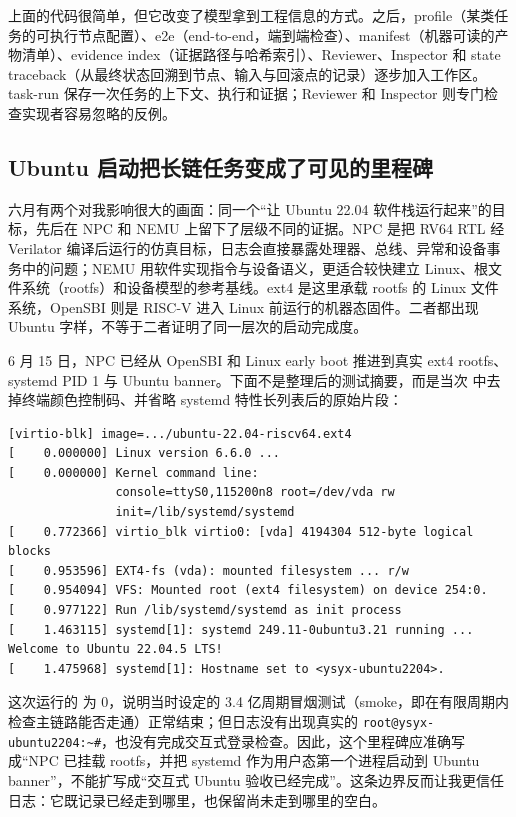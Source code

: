 \documentclass[UTF8,a4paper,zihao=-4,oneside]{ctexart}
\newcommand{\taskpath}[1]{\path{#1}}
\begin{document}
上面的代码很简单，但它改变了模型拿到工程信息的方式。之后，profile（某类任务的可执行节点配置）、e2e（end-to-end，端到端检查）、manifest（机器可读的产物清单）、evidence index（证据路径与哈希索引）、Reviewer、Inspector 和 state traceback（从最终状态回溯到节点、输入与回滚点的记录）逐步加入工作区。task-run 保存一次任务的上下文、执行和证据；Reviewer 和 Inspector 则专门检查实现者容易忽略的反例。

\subsection{Ubuntu 启动把长链任务变成了可见的里程碑}

六月有两个对我影响很大的画面：同一个“让 Ubuntu 22.04 软件栈运行起来”的目标，先后在 NPC 和 NEMU 上留下了层级不同的证据。NPC 是把 RV64 RTL 经 Verilator 编译后运行的仿真目标，日志会直接暴露处理器、总线、异常和设备事务中的问题；NEMU 用软件实现指令与设备语义，更适合较快建立 Linux、根文件系统（rootfs）和设备模型的参考基线。ext4 是这里承载 rootfs 的 Linux 文件系统，OpenSBI 则是 RISC-V 进入 Linux 前运行的机器态固件。二者都出现 Ubuntu 字样，不等于二者证明了同一层次的启动完成度。

6 月 15 日，NPC 已经从 OpenSBI 和 Linux early boot 推进到真实 ext4 rootfs、systemd PID 1 与 Ubuntu banner。下面不是整理后的测试摘要，而是当次 \taskpath{console.log} 中去掉终端颜色控制码、并省略 systemd 特性长列表后的原始片段：

\noindent\begin{minipage}{\linewidth}
\begin{lstlisting}[numbers=none,
  caption={NPC/Verilator 启动 Ubuntu 22.04 rootfs 的日志摘录（2026-06-15）},
  label={log:npc-ubuntu}]
[virtio-blk] image=.../ubuntu-22.04-riscv64.ext4
[    0.000000] Linux version 6.6.0 ...
[    0.000000] Kernel command line:
               console=ttyS0,115200n8 root=/dev/vda rw
               init=/lib/systemd/systemd
[    0.772366] virtio_blk virtio0: [vda] 4194304 512-byte logical blocks
[    0.953596] EXT4-fs (vda): mounted filesystem ... r/w
[    0.954094] VFS: Mounted root (ext4 filesystem) on device 254:0.
[    0.977122] Run /lib/systemd/systemd as init process
[    1.463115] systemd[1]: systemd 249.11-0ubuntu3.21 running ...
Welcome to Ubuntu 22.04.5 LTS!
[    1.475968] systemd[1]: Hostname set to <ysyx-ubuntu2204>.
\end{lstlisting}
\end{minipage}

这次运行的 \taskpath{run.rc} 为 0，说明当时设定的 3.4 亿周期冒烟测试（smoke，即在有限周期内检查主链路能否走通）正常结束；但日志没有出现真实的 \texttt{root@ysyx-ubuntu2204:\textasciitilde\#}，也没有完成交互式登录检查。因此，这个里程碑应准确写成“NPC 已挂载 rootfs，并把 systemd 作为用户态第一个进程启动到 Ubuntu banner”，不能扩写成“交互式 Ubuntu 验收已经完成”。这条边界反而让我更信任日志：它既记录已经走到哪里，也保留尚未走到哪里的空白。
\end{document}
